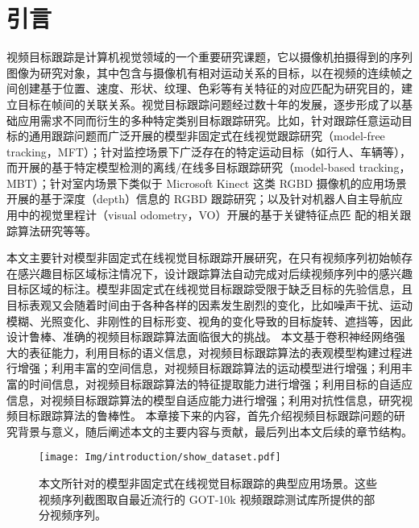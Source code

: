 \chapter{引言}\label{chap:introduction}
视频目标跟踪是计算机视觉领域的一个重要研究课题，它以摄像机拍摄得到的序列图像为研究对象，其中包含与摄像机有相对运动关系的目标，以在视频的连续帧之间创建基于位置、速度、形状、纹理、色彩等有关特征的对应匹配为研究目的，建立目标在帧间的关联关系。视觉目标跟踪问题经过数十年的发展，逐步形成了以基础应用需求不同而衍生的多种特定类别目标跟踪研究。比如，针对跟踪任意运动目标的通用跟踪问题而广泛开展的模型非固定式在线视觉跟踪研究（model-free tracking，MFT）；针对监控场景下广泛存在的特定运动目标（如行人、车辆等），而开展的基于特定模型检测的离线/在线多目标跟踪研究（model-based tracking，MBT）；针对室内场景下类似于 Microsoft Kinect 这类 RGBD 摄像机的应用场景开展的基于深度（depth）信息的 RGBD 跟踪研究；以及针对机器人自主导航应用中的视觉里程计（visual odometry，VO）开展的基于关键特征点匹 配的相关跟踪算法研究等等。

本文主要针对模型非固定式在线视觉目标跟踪开展研究，在只有视频序列初始帧存在感兴趣目标区域标注情况下，设计跟踪算法自动完成对后续视频序列中的感兴趣目标区域的标注。模型非固定式在线视觉目标跟踪受限于缺乏目标的先验信息，且目标表观又会随着时间由于各种各样的因素发生剧烈的变化，比如噪声干扰、运动模糊、光照变化、非刚性的目标形变、视角的变化导致的目标旋转、遮挡等，因此设计鲁棒、准确的视频目标跟踪算法面临很大的挑战。
本文基于卷积神经网络强大的表征能力，利用目标的语义信息，对视频目标跟踪算法的表观模型构建过程进行增强；利用丰富的空间信息，对视频目标跟踪算法的运动模型进行增强；利用丰富的时间信息，对视频目标跟踪算法的特征提取能力进行增强；利用目标的自适应信息，对视频目标跟踪算法的模型自适应能力进行增强；利用对抗性信息，研究视频目标跟踪算法的鲁棒性。
本章接下来的内容，首先介绍视频目标跟踪问题的研究背景与意义，随后阐述本文的主要内容与贡献，最后列出本文后续的章节结构。

\begin{figure}[t]
\centering
\texttt{[image: Img/introduction/show\_dataset.pdf]}
\caption{本文所针对的模型非固定式在线视觉目标跟踪的典型应用场景。这些视频序列截图取自最近流行的 GOT-10k \cite{GOT-10k} 视频跟踪测试库所提供的部分视频序列。}
\end{figure}

